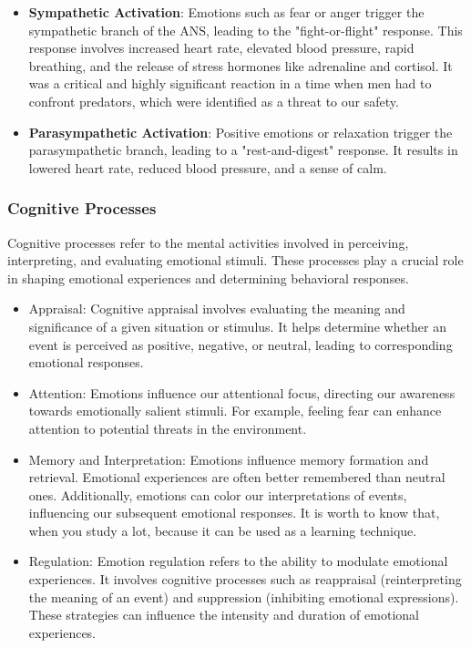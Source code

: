 \begin{itemize}
    \item \textbf{Sympathetic Activation}: Emotions such as fear or anger trigger the sympathetic branch of the ANS, leading to the "fight-or-flight" response.
    This response involves increased heart rate, elevated blood pressure, rapid breathing, and the release of stress hormones like adrenaline and cortisol.
    It was a critical and highly significant reaction in a time when men had to confront predators, which were identified as a threat to our safety.
    \item \textbf{Parasympathetic Activation}: Positive emotions or relaxation trigger the parasympathetic branch, leading to a "rest-and-digest" response. 
    It results in lowered heart rate, reduced blood pressure, and a sense of calm.
\end{itemize}

\subsubsection{Cognitive Processes}
Cognitive processes refer to the mental activities involved in perceiving, interpreting, and evaluating emotional stimuli. 
These processes play a crucial role in shaping emotional experiences and determining behavioral responses.

\begin{itemize}
    \item Appraisal: Cognitive appraisal involves evaluating the meaning and significance of a given situation or stimulus. 
    It helps determine whether an event is perceived as positive, negative, or neutral, leading to corresponding emotional responses.
    \item Attention: Emotions influence our attentional focus, directing our awareness towards emotionally salient stimuli. 
    For example, feeling fear can enhance attention to potential threats in the environment.
    \item Memory and Interpretation: Emotions influence memory formation and retrieval. 
    Emotional experiences are often better remembered than neutral ones. 
    Additionally, emotions can color our interpretations of events, influencing our subsequent emotional responses.
    It is worth to know that, when you study a lot, because it can be used as a learning technique.
    \item Regulation: Emotion regulation refers to the ability to modulate emotional experiences.
    It involves cognitive processes such as reappraisal (reinterpreting the meaning of an event) and suppression (inhibiting emotional expressions). 
    These strategies can influence the intensity and duration of emotional experiences.
\end{itemize}